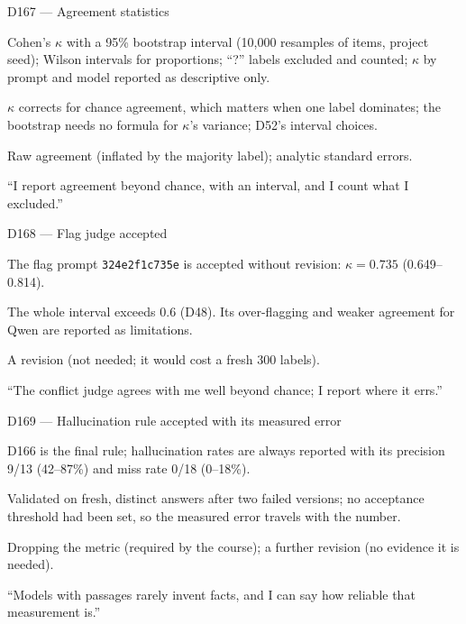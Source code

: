\documentclass[11pt,a4paper]{report}
\begin{document}
\begin{decisionbox}{D167 --- Agreement statistics}
\begin{description}[nosep, leftmargin=0pt]
  \item[Decision.] Cohen's $\kappa$ with a 95\% bootstrap interval (10{,}000 resamples of items, project seed); Wilson intervals for proportions; ``?'' labels excluded and counted; $\kappa$ by prompt and model reported as descriptive only.
  \item[Why.] $\kappa$ corrects for chance agreement, which matters when one label dominates; the bootstrap needs no formula for $\kappa$'s variance; D52's interval choices.
  \item[Alternatives.] Raw agreement (inflated by the majority label); analytic standard errors.
  \item[Interview line.] ``I report agreement beyond chance, with an interval, and I count what I excluded.''
\end{description}
\end{decisionbox}

\begin{decisionbox}{D168 --- Flag judge accepted}
\begin{description}[nosep, leftmargin=0pt]
  \item[Decision.] The flag prompt \texttt{324e2f1c735e} is accepted without revision: $\kappa = 0.735$ (0.649--0.814).
  \item[Why.] The whole interval exceeds 0.6 (D48). Its over-flagging and weaker agreement for Qwen are reported as limitations.
  \item[Alternatives.] A revision (not needed; it would cost a fresh 300 labels).
  \item[Interview line.] ``The conflict judge agrees with me well beyond chance; I report where it errs.''
\end{description}
\end{decisionbox}

\begin{decisionbox}{D169 --- Hallucination rule accepted with its measured error}
\begin{description}[nosep, leftmargin=0pt]
  \item[Decision.] D166 is the final rule; hallucination rates are always reported with its precision 9/13 (42--87\%) and miss rate 0/18 (0--18\%).
  \item[Why.] Validated on fresh, distinct answers after two failed versions; no acceptance threshold had been set, so the measured error travels with the number.
  \item[Alternatives.] Dropping the metric (required by the course); a further revision (no evidence it is needed).
  \item[Interview line.] ``Models with passages rarely invent facts, and I can say how reliable that measurement is.''
\end{description}
\end{decisionbox}
\end{document}
